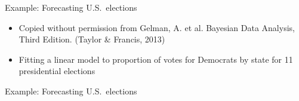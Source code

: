 \begin{frame}{Example: Forecasting U.S.\ elections}
  \begin{itemize}
    \item Copied without permission from Gelman, A. et al. Bayesian Data Analysis, Third Edition. (Taylor \& Francis, 2013)
    \vspace{\baselineskip}
    \item Fitting a linear model to proportion of votes for Democrats by state for 11 presidential elections
  \end{itemize}
  \begin{center}
  \end{center}
\end{frame}

\begin{frame}{Example: Forecasting U.S.\ elections}
  \begin{center}
  \end{center}
\end{frame}

